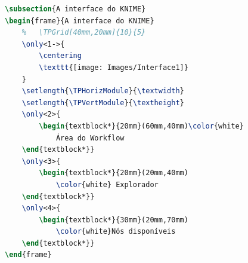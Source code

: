 \begin{lstlisting}[language=TeX,caption={Código \LaTeX\ para gerar os slides da Figura \ref{fig:beamer}},label={list:beamer}]
\subsection{A interface do KNIME}
\begin{frame}{A interface do KNIME}
    %   \TPGrid[40mm,20mm]{10}{5}
    \only<1->{
        \centering
        \texttt{[image: Images/Interface1]}
    }
    \setlength{\TPHorizModule}{\textwidth}
    \setlength{\TPVertModule}{\textheight}
    \only<2>{
        \begin{textblock*}{20mm}(60mm,40mm)\color{white}
            Área do Workflow
    \end{textblock*}}
    \only<3>{
        \begin{textblock*}{20mm}(20mm,40mm)
            \color{white} Explorador
    \end{textblock*}}
    \only<4>{
        \begin{textblock*}{30mm}(20mm,70mm)
            \color{white}Nós disponíveis
    \end{textblock*}}
\end{frame}
\end{lstlisting}